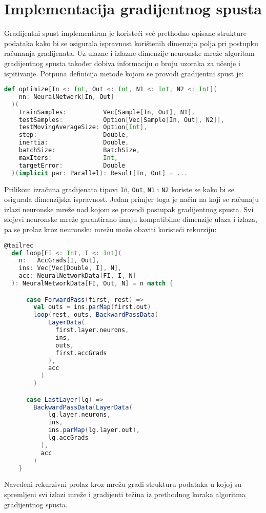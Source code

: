 \section*{Implementacija gradijentnog spusta}
Gradijentni spust implementiran je koristeći već prethodno opisane strukture podataka kako bi se osigurala ispravnost
korištenih dimenzija polja pri postupku računanja gradijenata. Uz ulazne i izlazne dimenzije neuronske mreže algoritam
gradijentnog spusta također dobiva informaciju o broju uzoraka za učenje i ispitivanje. Potpuna definicija metode kojom
se provodi gradijentni spust je:
\begin{lstlisting}[language=scala,label={lst:lstlisting8}]
  def optimize[In <: Int, Out <: Int, N1 <: Int, N2 <: Int](
    nn: NeuralNetwork[In, Out]
  )(
    trainSamples:          Vec[Sample[In, Out], N1],
    testSamples:           Option[Vec[Sample[In, Out], N2]],
    testMovingAverageSize: Option[Int],
    step:                  Double,
    inertia:               Double,
    batchSize:             BatchSize,
    maxIters:              Int,
    targetError:           Double
  )(implicit par: Parallel): Result[In, Out] = ...
\end{lstlisting}
Prilikom izračuna gradijenata tipovi \texttt{In}, \texttt{Out}, \texttt{N1} i \texttt{N2} koriste se kako bi se
osigurala dimenzijska ispravnost. Jedan primjer toga je način na koji se računaju izlazi neuronske mreže nad kojom se
provodi postupak gradijentnog spusta. Svi slojevi neuronske mreže garantirano imaju kompatibilne dimenzije ulaza i
izlaza, pa se prolaz kroz neuronsku mrežu može obaviti koristeći rekurziju:
\begin{lstlisting}[language=scala,label={lst:lstlisting9}]
  @tailrec
  def loop[FI <: Int, I <: Int](
    n:   AccGrads[I, Out],
    ins: Vec[Vec[Double, I], N],
    acc: NeuralNetworkData[FI, I, N]
  ): NeuralNetworkData[FI, Out, N] = n match {

      case ForwardPass(first, rest) =>
        val outs = ins.parMap(first.out)
        loop(rest, outs, BackwardPassData(
            LayerData(
              first.layer.neurons,
              ins,
              outs,
              first.accGrads
            ),
            acc
          )
        )

      case LastLayer(lg) =>
        BackwardPassData(LayerData(
            lg.layer.neurons,
            ins,
            ins.parMap(lg.layer.out),
            lg.accGrads
          ),
          acc
        )
    }
\end{lstlisting}
Navedeni rekurzivni prolaz kroz mrežu gradi strukturu podataka u kojoj su spremljeni svi izlazi mreže i gradijenti
težina iz prethodnog koraka algoritma gradijentnog spusta.

